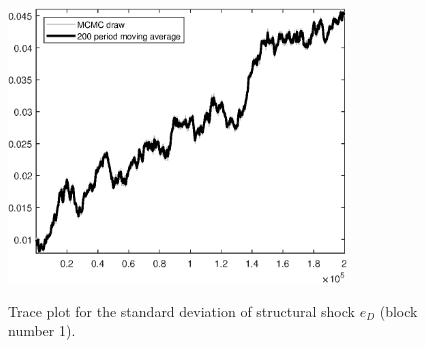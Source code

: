 \begin{figure}[H]
\centering
  \includegraphics[width=0.8\textwidth]{BRS_sectoral_rest/graphs/TracePlot_SE_e_D_blck_1}\\
    \caption{Trace plot for the standard deviation of structural shock ${e_D}$ (block number 1).}
\end{figure}
